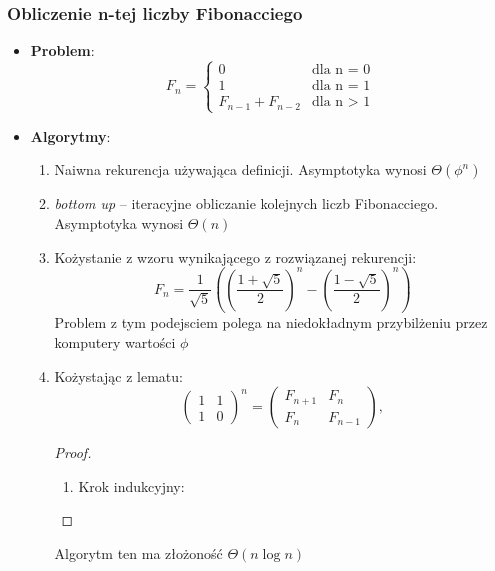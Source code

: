 \documentclass[11pt,a4paper]{article}
\begin{document}
\subsubsection{Obliczenie n-tej liczby Fibonacciego}
\begin{itemize}
    \item \textbf{Problem}:
        \[
            F_n = \begin{cases}
                0 & \text{dla n = 0} \\
                1 & \text{dla n = 1} \\
                F_{n-1} + F_{n-2} & \text{dla n > 1}
            \end{cases}
        \]
    \item \textbf{Algorytmy}:
        \begin{enumerate}
            \item Naiwna rekurencja używająca definicji. Asymptotyka wynosi $\Theta(\phi^n)$
            \item \textit{bottom up} -- iteracyjne obliczanie kolejnych liczb Fibonacciego. Asymptotyka wynosi $\Theta(n)$
            \item Kożystanie z wzoru wynikającego z rozwiązanej rekurencji:
                \[
                    F_n = \frac{1}{\sqrt{5}} \left( \left(\frac{1+\sqrt{5}}{2}\right)^n - \left(\frac{1-\sqrt{5}}{2}\right)^n \right)
                \]
                Problem z tym podejsciem polega na niedokładnym przybilżeniu przez komputery wartości $\phi$
            \item Kożystając z lematu:
                \[
                    \begin{pmatrix}
                        1 & 1 \\
                        1 & 0
                    \end{pmatrix}^n
                    =
                    \begin{pmatrix}
                        F_{n+1} & F_n \\
                        F_n & F_{n-1}
                    \end{pmatrix},
                \]
                \begin{proof}
                    \begin{enumerate}
                        \item Krok indukcyjny:
                            \[
                            \]
                    \end{enumerate}
                \end{proof}
                Algorytm ten ma złożoność $\Theta(n\log n)$
        \end{enumerate}
\end{itemize}
\end{document}
